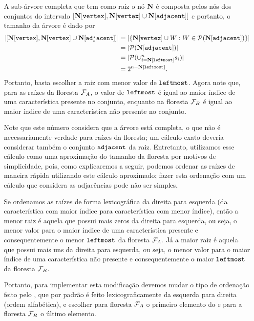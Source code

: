 A sub-árvore completa que tem como raiz o nó $\mathbf N$ é composta 
pelos nós dos conjuntos do intervalo 
$[\mathbf N[\texttt{vertex}], \mathbf N[\texttt{vertex}] \cup \mathbf N[\texttt{adjacent}]]$ e 
portanto, o tamanho da árvore é dado por
\begin{subequations}
\begin{align*}
|[\mathbf N[\texttt{vertex}], \mathbf N[\texttt{vertex}] \cup \mathbf N[\texttt{adjacent}]]| &= 
|\{\mathbf N[\texttt{vertex}] \cup W : W \in \mathcal{P} (\mathbf N[\texttt{adjacent}])\}| \\
    &= |\mathcal{P}(\mathbf N[\texttt{adjacent}])| \\
    &= |\mathcal{P}(\cup_{i = \mathbf N[\texttt{leftmost}]}^{n} s_i)| \\
    &= 2^{n - \mathbf N[\texttt{leftmost}]}.
\end{align*}
\end{subequations}
Portanto, basta escolher a raiz com menor valor de $\texttt{leftmost}$.
Agora note que, para as raízes da floresta $\mathcal{F}_A$, o valor de 
$\texttt{leftmost}$ é igual ao maior índice de uma característica
presente no conjunto, enquanto na floresta $\mathcal{F}_B$ é igual ao maior
índice de uma característica não presente no conjunto.

Note que este número considera que a árvore está completa, o que não é
necessariamente verdade para raízes da floresta; um cálculo exato 
deveria considerar também o conjunto $\texttt{adjacent}$ da raiz. 
Entretanto, utilizamos esse cálculo como uma aproximação do tamanho da 
floresta por motivos de simplicidade, pois, como explicaremos a seguir,
podemos ordenar as raízes de maneira rápida utilizando este cálculo 
aproximado; fazer esta ordenação com um cálculo que considera as 
adjacências pode não ser simples.

Se ordenamos as raízes de forma lexicográfica da direita
para esquerda (da característica com maior índice para característica
com menor índice), então a menor raiz é aquela que possui mais zeros
da direita para esquerda, ou seja, o menor valor para o maior índice
de uma característica presente e consequentemente o menor 
$\texttt{leftmost}$ da floresta $\mathcal{F}_A$. Já a maior raiz é aquela 
que possui mais uns da direita para esquerda, ou seja, o menor valor 
para o maior índice de uma característica não presente e 
consequentemente o maior $\texttt{leftmost}$ da floresta $\mathcal{F}_B$.

Portanto, para implementar esta modificação devemos mudar o tipo de
ordenação feito pelo , que por padrão é feito 
lexicograficamente da esquerda para direita (ordem alfabética), e 
escolher para floresta $\mathcal{F}_A$ o primeiro elemento do 
e para a floresta $\mathcal{F}_B$ o último elemento.


